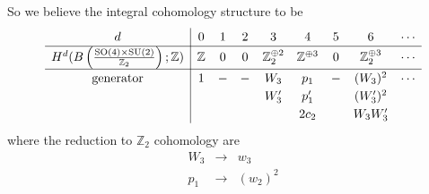 \documentclass[12pt]{article}
\numberwithin{equation}{section}
\def\bZ{\mathbb{Z}}
\def\SU{\mathrm{SU}}
\def\SO{\mathrm{SO}}
\begin{document}
So we believe the integral cohomology structure to be
\begin{equation}
	\label{case1}
	\renewcommand{\arraystretch}{1.2}
	\begin{array}{c|cccccccccccccccc}
		d & 0 & 1 & 2 & 3 & 4 & 5 & 6 & \cdots \\
		\hline
		H^d(B\left(\tfrac{\SO(4)\times \SU(2)}{\bZ_2}\right);\bZ) & \bZ & 0 & 0 & \bZ_2^{\oplus 2} & \bZ^{\oplus 3} & 0 & \bZ_2^{\oplus 3} & \cdots\\
		\hline
		\text{generator} & 1 & - & - & W_3 & p_1 & - & (W_3)^2 & \cdots\\
		&&&& W'_3 & p'_1 && (W'_3)^2\\
		&&&&& 2c_2 && W_3W'_3
	\end{array}
\end{equation}
where the reduction to $\bZ_2$ cohomology are
\begin{equation}
	\begin{array}{ccc}
		W_3 & \to & w_3\\
		p_1 & \to & (w_2)^2\\
	\end{array}
\end{equation}
\end{document}
